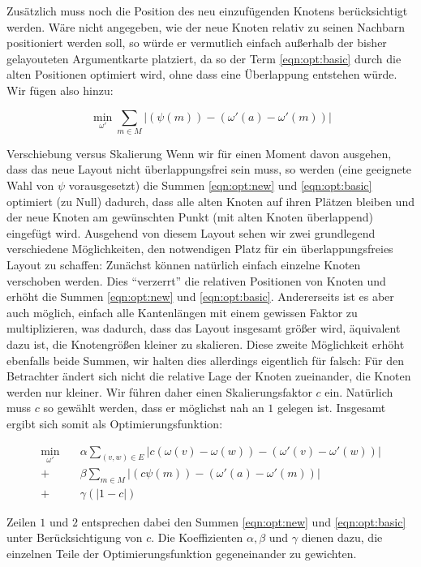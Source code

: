 Zusätzlich muss noch die Position des neu einzufügenden Knotens berücksichtigt werden. Wäre nicht angegeben, wie der neue Knoten relativ zu seinen Nachbarn positioniert werden soll, so würde er vermutlich einfach außerhalb der bisher gelayouteten Argumentkarte platziert, da so der Term \ref{eqn:opt:basic} durch die alten Positionen optimiert wird, ohne dass eine Überlappung entstehen würde. Wir fügen also hinzu:

\begin{equation}
  \label{eqn:opt:new}
  \min_{\omega'} \sum \limits_{m \in M} {|(\psi(m)) - (\omega'(a) - \omega'(m))|}
\end{equation}

\begin{paragraph}{Verschiebung versus Skalierung}
  \label{par:scale}
  Wenn wir für einen Moment davon ausgehen, dass das neue Layout nicht überlappungsfrei sein muss, so werden (eine geeignete Wahl von $\psi$ vorausgesetzt) die Summen \ref{eqn:opt:new} und \ref{eqn:opt:basic} optimiert (zu Null) dadurch, dass alle alten Knoten auf ihren Plätzen bleiben und der neue Knoten am gewünschten Punkt (mit alten Knoten überlappend) eingefügt wird. Ausgehend von diesem Layout sehen wir zwei grundlegend verschiedene Möglichkeiten, den notwendigen Platz für ein überlappungsfreies Layout zu schaffen: Zunächst können natürlich einfach einzelne Knoten verschoben werden. Dies "`verzerrt"' die relativen Positionen von Knoten und erhöht die Summen \ref{eqn:opt:new} und \ref{eqn:opt:basic}. Andererseits ist es aber auch möglich, einfach alle Kantenlängen mit einem gewissen Faktor zu multiplizieren, was dadurch, dass das Layout insgesamt größer wird, äquivalent dazu ist, die Knotengrößen kleiner zu skalieren. Diese zweite Möglichkeit erhöht ebenfalls beide Summen, wir halten dies allerdings eigentlich für falsch: Für den Betrachter ändert sich nicht die relative Lage der Knoten zueinander, die Knoten werden nur kleiner. Wir führen daher einen Skalierungsfaktor $c$ ein. Natürlich muss $c$ so gewählt werden, dass er möglichst nah an $1$ gelegen ist. Insgesamt ergibt sich somit als Optimierungsfunktion:
\end{paragraph}

\begin{align}
  \label{eqn:opt:complete}
 \min_{\omega'} \quad & \alpha \sum \limits_{(v,w) \in E} {|c(\omega(v) - \omega(w)) - (\omega'(v) - \omega'(w))|} \nonumber \\
  + & \beta \sum \limits_{m \in M} {|(c\psi(m)) - (\omega'(a) - \omega'(m))|} \nonumber \\
  + & \gamma (|1 - c|)
\end{align}

Zeilen $1$ und $2$ entsprechen dabei den Summen \ref{eqn:opt:new} und \ref{eqn:opt:basic} unter Berücksichtigung von $c$. Die Koeffizienten $\alpha, \beta$ und $\gamma$ dienen dazu, die einzelnen Teile der Optimierungsfunktion gegeneinander zu gewichten.
